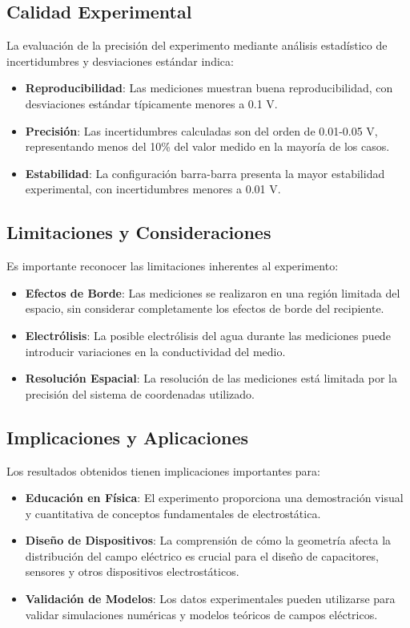 \documentclass[11pt,twocolumn]{article}
\begin{document}
\subsection{Calidad Experimental}

La evaluación de la precisión del experimento mediante análisis estadístico de incertidumbres y desviaciones estándar indica:

\begin{itemize}
\item \textbf{Reproducibilidad}: Las mediciones muestran buena reproducibilidad, con desviaciones estándar típicamente menores a 0.1 V.
\item \textbf{Precisión}: Las incertidumbres calculadas son del orden de 0.01-0.05 V, representando menos del 10\% del valor medido en la mayoría de los casos.
\item \textbf{Estabilidad}: La configuración barra-barra presenta la mayor estabilidad experimental, con incertidumbres menores a 0.01 V.
\end{itemize}

\subsection{Limitaciones y Consideraciones}

Es importante reconocer las limitaciones inherentes al experimento:

\begin{itemize}
\item \textbf{Efectos de Borde}: Las mediciones se realizaron en una región limitada del espacio, sin considerar completamente los efectos de borde del recipiente.
\item \textbf{Electrólisis}: La posible electrólisis del agua durante las mediciones puede introducir variaciones en la conductividad del medio.
\item \textbf{Resolución Espacial}: La resolución de las mediciones está limitada por la precisión del sistema de coordenadas utilizado.
\end{itemize}

\subsection{Implicaciones y Aplicaciones}

Los resultados obtenidos tienen implicaciones importantes para:

\begin{itemize}
\item \textbf{Educación en Física}: El experimento proporciona una demostración visual y cuantitativa de conceptos fundamentales de electrostática.
\item \textbf{Diseño de Dispositivos}: La comprensión de cómo la geometría afecta la distribución del campo eléctrico es crucial para el diseño de capacitores, sensores y otros dispositivos electrostáticos.
\item \textbf{Validación de Modelos}: Los datos experimentales pueden utilizarse para validar simulaciones numéricas y modelos teóricos de campos eléctricos.
\end{itemize}
\end{document}
